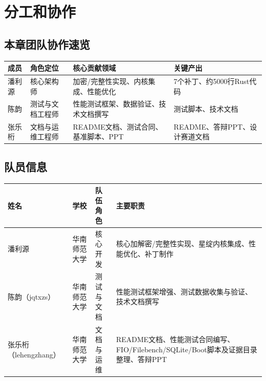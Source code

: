 \chapter{分工和协作}

\section*{本章团队协作速览}

\begin{table}[H]
    \centering
    \begin{tabular}{p{}p{}p{}p{}}
        \toprule
        \textbf{成员} & \textbf{角色定位} & \textbf{核心贡献领域} & \textbf{关键产出} \\
        \midrule
        潘利源 & 核心架构师 & 加密/完整性实现、内核集成、性能优化 & 7个补丁、约5000行Rust代码 \\
        陈韵 & 测试与文档工程师 & 性能测试框架、数据验证、技术文档撰写 & 测试脚本、技术文档 \\
        张乐桁 & 文档与运维工程师 & README文档、测试合同、基准脚本、PPT & README、答辩PPT、设计赛道文档 \\
        \bottomrule
    \end{tabular}
\end{table}

\section{队员信息}

\begin{table}[H]
    \centering
    \begin{tabular}{p{}p{}p{}p{}}
        \toprule
        \textbf{姓名} & \textbf{学校} & \textbf{队伍角色} & \textbf{主要职责} \\
        \midrule
        潘利源 & 华南师范大学 & 核心开发 & 核心加解密/完整性实现、星绽内核集成、性能优化、补丁制作 \\
        陈韵（jqtxzs） & 华南师范大学 & 测试与文档 & 性能测试框架增强、测试数据收集与验证、技术文档撰写 \\
        张乐桁（lehengzhang） & 华南师范大学 & 文档与运维 & README文档、性能测试合同编写、FIO/Filebench/SQLite/Boot脚本及证据目录整理、答辩PPT \\
        \bottomrule
    \end{tabular}
\end{table}

